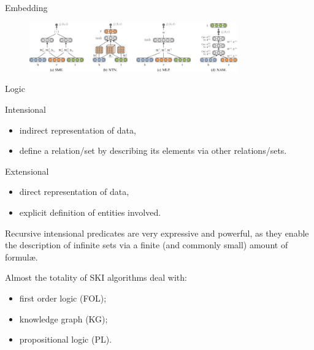 \documentclass[presentation]{beamer}\mode<presentation>{\usetheme{AMSBolognaFC}}
\begin{document}
\begin{frame}[allowframebreaks]{Embedding}
    \begin{figure}
        \centering
        \includegraphics[width=0.8\textwidth]{figures/kge-nn-2.png}
    \end{figure}
    
\end{frame}

\begin{frame}[allowframebreaks]{Logic}
    \begin{block}{Intensional}
        \begin{itemize}
            \item indirect representation of data,
            \item define a relation/set by describing its elements via other relations/sets.
        \end{itemize}
    \end{block}
    \begin{block}{Extensional}
        \begin{itemize}
            \item direct representation of data,
            \item explicit definition of entities involved.
        \end{itemize}
    \end{block}
    
    Recursive intensional predicates are very expressive and powerful, as they enable the description of infinite sets via a finite (and commonly small) amount of formul\ae.
    
    \framebreak        
    
    Almost the totality of SKI algorithms deal with:
    \begin{itemize}
        \item \alert{first order logic} (FOL);
        \item \alert{knowledge graph} (KG);
        \item \alert{propositional logic} (PL).
        
    \end{itemize}
\end{frame}
    
\end{document}
